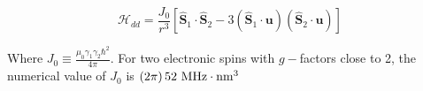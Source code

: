 \documentclass[a4paper]{article}
\begin{document}
\begin{equation}
\mathcal{H}_{dd}=\frac{J_0}{r^3}\left[ \hat{\mathbf{S}}_1\cdot\hat{\mathbf{S}}_2 - 3 (\hat{\mathbf{S}}_1\cdot\mathbf{u})(\hat{\mathbf{S}}_2\cdot\mathbf{u})\right]
\end{equation}

Where $J_0\equiv \frac{\mu_0\gamma_1\gamma_2 \hbar^2}{4\pi}$. For two electronic spins with $g-$factors close to 2, the numerical value of $J_0$ is $(2\pi)\,52\ \rm{MHz}\cdot\rm{nm}^3$
\printbibliography
\end{document}
